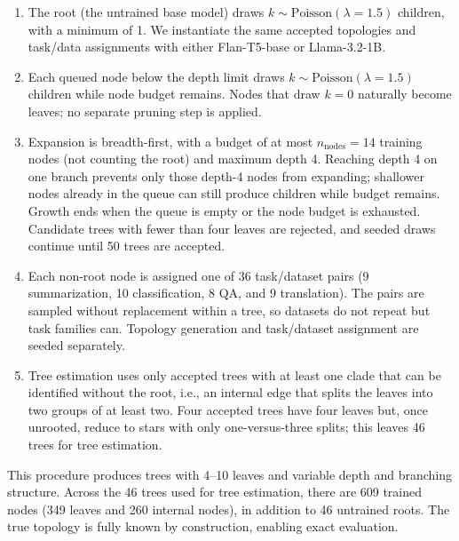 \documentclass{article}
\theoremstyle{definition}
\theoremstyle{plain}
\begin{document}
\begin{enumerate}
    \item The root (the untrained base model) draws $k \sim \mathrm{Poisson}(\lambda = 1.5)$ children, with a minimum of 1. We instantiate the same accepted topologies and task/data assignments with either Flan-T5-base or Llama-3.2-1B.
    \item Each queued node below the depth limit draws $k \sim \mathrm{Poisson}(\lambda = 1.5)$ children while node budget remains. Nodes that draw $k = 0$ naturally become leaves; no separate pruning step is applied.
    \item Expansion is breadth-first, with a budget of at most $n_\mathrm{nodes} = 14$ training nodes (not counting the root) and maximum depth 4. Reaching depth 4 on one branch prevents only those depth-4 nodes from expanding; shallower nodes already in the queue can still produce children while budget remains. Growth ends when the queue is empty or the node budget is exhausted. Candidate trees with fewer than four leaves are rejected, and seeded draws continue until 50 trees are accepted.
    \item Each non-root node is assigned one of 36 task/dataset pairs (9 summarization, 10 classification, 8 QA, and 9 translation). The pairs are sampled without replacement within a tree, so datasets do not repeat but task families can. Topology generation and task/dataset assignment are seeded separately.
    \item Tree estimation uses only accepted trees with at least one clade that can be identified without the root, i.e., an internal edge that splits the leaves into two groups of at least two. Four accepted trees have four leaves but, once unrooted, reduce to stars with only one-versus-three splits; this leaves 46 trees for tree estimation.
\end{enumerate}

This procedure produces trees with 4--10 leaves and variable depth and branching
structure. Across the 46 trees used for tree estimation, there are 609 trained nodes (349 leaves and 260 internal
nodes), in addition to 46 untrained roots. The true topology is fully known by construction,
enabling exact evaluation.
\end{document}
